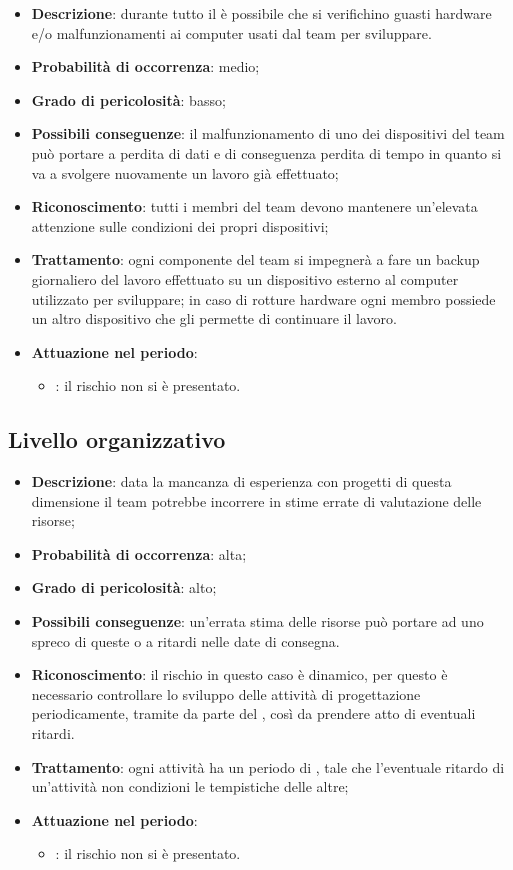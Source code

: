 \documentclass[PianoDiProgetto.tex]{subfiles}
\begin{document}
		\begin{itemize}
		\item \textbf{Descrizione}: durante tutto il  è possibile che si verifichino guasti hardware e/o malfunzionamenti  ai computer usati dal team per sviluppare.
		\item \textbf{Probabilità di occorrenza}: medio;
		\item \textbf{Grado di pericolosità}: basso;
		\item \textbf{Possibili conseguenze}: il malfunzionamento di uno dei dispositivi del team può portare a perdita di dati e di conseguenza perdita di tempo in quanto si va a svolgere nuovamente un lavoro già effettuato;
		\item \textbf{Riconoscimento}: tutti i membri del team devono mantenere un'elevata attenzione sulle condizioni dei propri dispositivi;
		\item \textbf{Trattamento}: ogni componente del team si impegnerà a fare un backup giornaliero del lavoro effettuato su un dispositivo esterno al computer utilizzato per sviluppare; in caso di rotture hardware ogni membro possiede un altro dispositivo che gli permette di continuare il lavoro.
		\item \textbf{Attuazione nel periodo}: 
			\begin{itemize}
				\item \ARdoc : il rischio non si è presentato.
			\end{itemize}
	
	\end{itemize}

	\subsection{Livello organizzativo}
		\label{sec:lo}
		\begin{itemize}
		\item \textbf{Descrizione}: data la mancanza di esperienza con progetti di questa dimensione il team potrebbe incorrere in stime errate di valutazione delle risorse;
		\item \textbf{Probabilità di occorrenza}: alta;
		\item \textbf{Grado di pericolosità}: alto;
		\item \textbf{Possibili conseguenze}: un'errata stima delle risorse può portare ad uno spreco di queste o a ritardi nelle date di consegna.
		\item \textbf{Riconoscimento}: il rischio in questo caso è dinamico, per questo è necessario controllare lo sviluppo delle attività di progettazione periodicamente, tramite   da parte del \RESP{}, così da prendere atto di eventuali ritardi.
		\item \textbf{Trattamento}: ogni attività ha un periodo di , tale che l'eventuale ritardo di un'attività non condizioni le tempistiche delle altre;
		\item \textbf{Attuazione nel periodo}: 
			\begin{itemize}
				\item \PerAR : il rischio non si è presentato.
			\end{itemize}
	\end{itemize}
	
\end{document}
